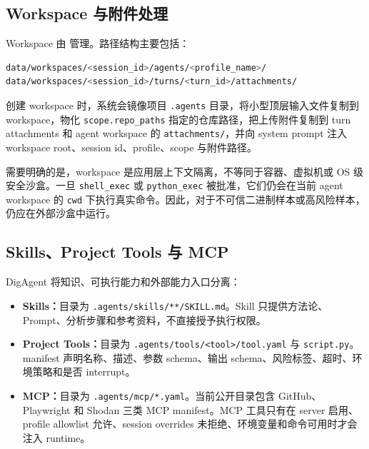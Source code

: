 \documentclass[UTF8,zihao=-4,a4paper,fontset=none]{ctexart}
\newcommand{\code}[1]{\texttt{\footnotesize #1}}
\begin{document}
\subsection{Workspace 与附件处理}

Workspace 由  管理。路径结构主要包括：

\begin{lstlisting}[language=bash,caption={Workspace 路径结构}]
data/workspaces/<session_id>/agents/<profile_name>/
data/workspaces/<session_id>/turns/<turn_id>/attachments/
\end{lstlisting}

创建 workspace 时，系统会镜像项目 \code{.agents} 目录，将小型顶层输入文件复制到 workspace，物化 \code{scope.repo\_paths} 指定的仓库路径，把上传附件复制到 turn attachments 和 agent workspace 的 \code{attachments/}，并向 system prompt 注入 workspace root、session id、profile、scope 与附件路径。

需要明确的是，workspace 是应用层上下文隔离，不等同于容器、虚拟机或 OS 级安全沙盒。一旦 \code{shell\_exec} 或 \code{python\_exec} 被批准，它们仍会在当前 agent workspace 的 \code{cwd} 下执行真实命令。因此，对于不可信二进制样本或高风险样本，仍应在外部沙盒中运行。

\subsection{Skills、Project Tools 与 MCP}

DigAgent 将知识、可执行能力和外部能力入口分离：

\begin{itemize}
  \item \textbf{Skills：}目录为 \code{.agents/skills/**/SKILL.md}。Skill 只提供方法论、Prompt、分析步骤和参考资料，不直接授予执行权限。
  \item \textbf{Project Tools：}目录为 \code{.agents/tools/<tool>/tool.yaml} 与 \code{script.py}。manifest 声明名称、描述、参数 schema、输出 schema、风险标签、超时、环境策略和是否 interrupt。
  \item \textbf{MCP：}目录为 \code{.agents/mcp/*.yaml}。当前公开目录包含 GitHub、Playwright 和 Shodan 三类 MCP manifest。MCP 工具只有在 server 启用、profile allowlist 允许、session overrides 未拒绝、环境变量和命令可用时才会注入 runtime。
\end{itemize}
\end{document}
